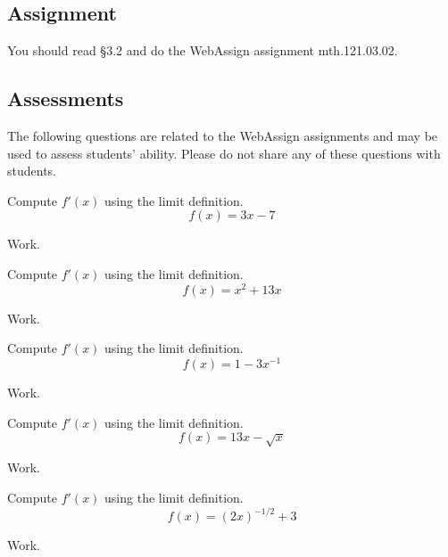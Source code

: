 \documentclass[12pt,addpoints, answers, fleqn]{exam}
\begin{document}
\subsection{Assignment}
You should read \S  3.2 and do the WebAssign assignment mth.121.03.02.
\vfill
\pagebreak
\begin{teacher}
\subsection{Assessments}
The following questions are related to the WebAssign assignments and may be used to assess students' ability. Please do not share any of these questions with students.
\begin{questions}		
\question 	%

Compute $f'\left(x\right)$ using the limit definition.
\[
f\left(x\right) = 3x - 7
\]
\begin{solution}
Work.
\end{solution}

\question 	%

Compute $f'\left(x\right)$ using the limit definition.
\[
f\left(x\right) = x^2+13x
\]
\begin{solution}
Work.
\end{solution}

\question 	%

Compute $f'\left(x\right)$ using the limit definition.
\[
f\left(x\right) = 1 - 3x^{-1}
\]
\begin{solution}
Work.
\end{solution}

\question 	%

Compute $f'\left(x\right)$ using the limit definition.
\[
f\left(x\right) = 13x - \sqrt{x}
\]
\begin{solution}
Work.
\end{solution}

\question 	%

Compute $f'\left(x\right)$ using the limit definition.
\[
f\left(x\right) = \left( 2x \right)^{-1/2} + 3
\]
\begin{solution}
Work.
\end{solution}

\question 	%


\end{questions}
\end{teacher}
\end{document}

